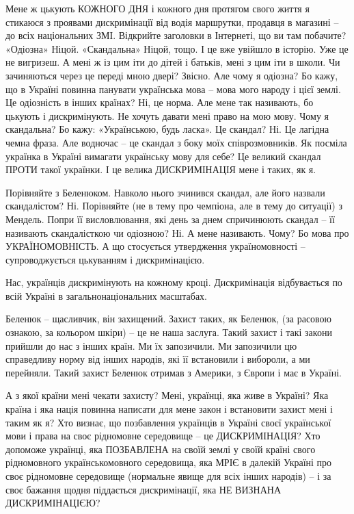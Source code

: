 Мене ж цькують КОЖНОГО ДНЯ і кожного дня протягом свого життя я стикаюся з
проявами дискримінації від водія маршрутки, продавця в магазині – до всіх
національних ЗМІ. Відкрийте заголовки в Інтернеті, що ви там побачите?
«Одіозна» Ніцой. «Скандальна» Ніцой, тощо. І це вже увійшло в історію. Уже це
не вигризеш. А мені ж із цим іти до дітей і батьків, мені з цим іти в школи. Чи
зачиняються через це переді мною двері? Звісно.  Але чому я одіозна? Бо кажу,
що в Україні повинна панувати українська мова – мова мого народу і цієї землі.
Це одіозність в інших країнах? Ні, це норма. Але мене так називають, бо цькують
і дискримінують. Не хочуть давати мені право на мою мову. Чому я скандальна? Бо
кажу: «Українською, будь ласка». Це скандал? Ні. Це лагідна чемна фраза. Але
водночас – це скандал з боку моїх співрозмовників. Як посміла українка в
Україні вимагати українську мову для себе? Це великий скандал ПРОТИ такої
українки. І це велика ДИСКРИМІНАЦІЯ мене і таких, як я. 

Порівняйте з Беленюком. Навколо нього зчинився скандал, але його назвали
скандалістом? Ні. Порівняйте (не в тему про чемпіона, але в тему до ситуації) з
Мендель. Попри її висловлювання, які день за днем спричинюють скандал – її
називають скандалісткою чи одіозною? Ні. А мене називають. Чому? Бо мова про
УКРАЇНОМОВНІСТЬ. А що стосується утвердження україномовності – супроводжується
цькуванням і дискримінацією.

Нас, українців дискримінують на кожному кроці. Дискримінація відбувається по
всій Україні в загальнонаціональних масштабах.

Беленюк – щасливчик, він захищений. Захист таких, як Беленюк, (за расовою
ознакою, за кольором шкіри) – це не наша заслуга. Такий захист і такі закони
прийшли до нас з інших країн. Ми їх запозичили. Ми запозичили цю справедливу
норму від інших народів, які її встановили і вибороли, а ми перейняли. Такий
захист Беленюк отримав з Америки, з Європи і має в Україні.

А з якої країни мені чекати захисту? Мені, українці, яка живе в Україні? Яка
країна і яка нація повинна написати для мене закон і встановити захист мені і
таким як я? Хто визнає, що позбавлення українців в Україні своєї української
мови і права на своє рідномовне середовище – це ДИСКРИМІНАЦІЯ?  Хто допоможе
українці, яка ПОЗБАВЛЕНА на своїй землі у своїй країні свого рідномовного
українськомовного середовища, яка МРІЄ в далекій Україні про своє рідномовне
середовище (нормальне явище для всіх інших народів) – і за своє бажання щодня
піддається дискримінації, яка НЕ ВИЗНАНА ДИСКРИМІНАЦІЄЮ? 

